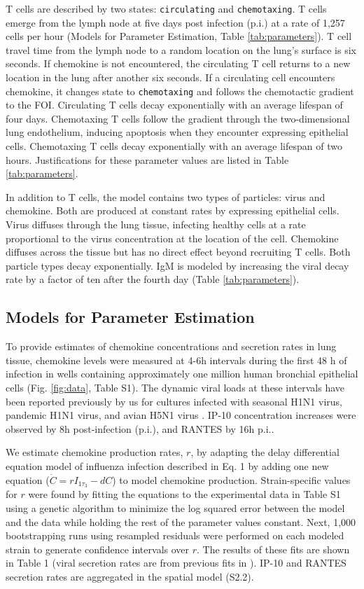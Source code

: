 \documentclass[preprint,10pt,numbers]{elsarticle}
\newcommand{\new}[1]{#1}
\begin{document}
T cells are described by two states: \texttt{circulating} and \texttt{chemotaxing}.    T cells emerge from the lymph node at five days post infection (p.i.) at a rate of 1,257 cells per hour (Models for Parameter Estimation, Table \ref{tab:parameters}). T cell travel time from the lymph node to a random location on the lung's surface is six seconds.  If chemokine is not encountered, the circulating T cell returns to a new location in the lung after another six seconds.  If a circulating cell encounters chemokine, it changes state to \texttt{chemotaxing} and follows the chemotactic gradient to the FOI. Circulating T cells decay exponentially with an average lifespan of four days.  Chemotaxing T cells follow the gradient through the two-dimensional lung endothelium, inducing apoptosis when they encounter expressing epithelial cells. Chemotaxing T cells decay exponentially with an average lifespan of two hours.  Justifications for these parameter values are listed in Table \ref{tab:parameters}.

In addition to T cells, the model contains two types of particles: virus and chemokine. Both are produced at constant rates by expressing epithelial cells.  Virus diffuses through the lung tissue, infecting healthy cells at a rate proportional to the virus concentration at the location of the cell. Chemokine diffuses across the tissue but has no direct effect beyond recruiting T cells. Both particle types decay exponentially.  IgM is modeled by increasing the viral decay rate by a factor of ten after the fourth day (Table \ref{tab:parameters}).

\subsection*{Models for Parameter Estimation}

To provide estimates of chemokine concentrations and secretion rates in lung tissue, chemokine levels were measured at 4-6h intervals during the first 48 h of infection in wells containing approximately one million human bronchial epithelial cells (Fig. \ref{fig:data}, Table S1).  The dynamic viral loads at these intervals have been reported previously by us for cultures infected with seasonal H1N1 virus, pandemic H1N1 virus, and avian H5N1 virus \citep{Mitchell2011}.  IP-10 concentration increases were observed by 8h post-infection (p.i.), and RANTES by 16h p.i..

We estimate chemokine production rates, $r$, by adapting the delay differential equation model of influenza infection described in \citep{Mitchell2011} Eq. 1 by adding one new equation ($\dot{C}=r I_{1 \tau_3}-dC$) to model chemokine production.   Strain-specific values for $r$ were found by fitting the equations to the experimental data in Table S1 using a genetic algorithm to minimize the log squared error between the model and the data while holding the rest of the parameter values constant.  Next, 1,000 bootstrapping runs \new{using resampled residuals} were performed on each modeled strain to generate confidence intervals over $r$.  The results of these fits are shown in Table 1 (viral secretion rates are from previous fits in \cite{Mitchell2011}).  IP-10 and RANTES secretion rates are aggregated in the spatial model (S2.2).
\end{document}
